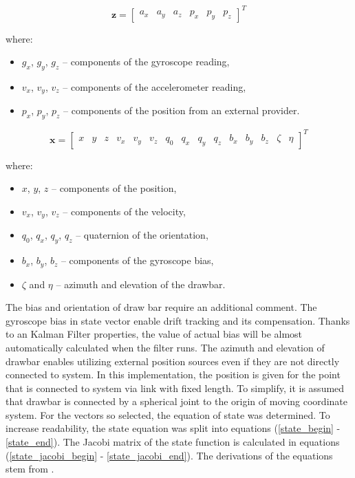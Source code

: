 \begin{equation}
	\bm{z} = \begin{bmatrix}
		a_x & a_y & a_z & p_x & p_y & p_z
	\end{bmatrix}^T
	\label{h_vec}
\end{equation}

where:
\begin{itemize}
	\item $g_x$, $g_y$, $g_z$ -- components of the gyroscope reading,
	\item $v_x$, $v_y$, $v_z$ -- components of the accelerometer reading,
	\item $p_x$, $p_y$, $p_z$ -- components of the position from an external provider.
\end{itemize}

\begin{equation}
	\bm{x} = \begin{bmatrix}
	x & y & z & v_x & v_y & v_z & q_0 & q_x & q_y & q_z & b_x & b_y & b_z & \zeta & \eta
	\end{bmatrix}^T
	\label{state_vec}
\end{equation}

where:
\begin{itemize}
	\item $x$, $y$, $z$ -- components of the position,
	\item $v_x$, $v_y$, $v_z$ -- components of the velocity,
	\item $q_0$, $q_x$, $q_y$, $q_z$ -- quaternion of the orientation,
	\item $b_x$, $b_y$, $b_z$ -- components of the gyroscope bias,
	\item $\zeta$ and $\eta$ -- azimuth and elevation of the drawbar.
\end{itemize}

The bias and orientation of draw bar require an additional comment. The gyroscope bias in state vector enable drift tracking and its compensation. Thanks to an Kalman Filter properties, the value of actual bias will be almost automatically calculated when the filter runs. The azimuth and elevation of drawbar enables utilizing external position sources even if they are not directly connected to system. In this implementation, the position is given for the point that is connected to system via link with fixed length. To simplify, it is assumed that drawbar is connected by a spherical joint to the origin of moving coordinate system. For the vectors so selected, the equation of state was determined. To increase readability, the state equation was split into equations (\ref{state_begin} - \ref{state_end}). The Jacobi matrix of the state function is calculated in equations (\ref{state_jacobi_begin} - \ref{state_jacobi_end}).  The derivations of the equations stem from \cite{ekf_poor}.

